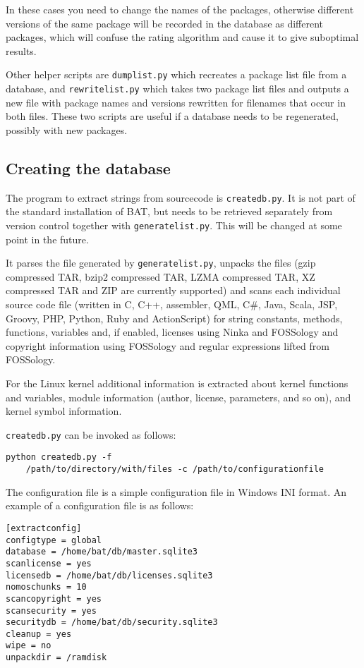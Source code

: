 \documentclass[10pt,a4paper]{article}
\begin{document}
In these cases you need to change the names of the packages, otherwise
different versions of the same package will be recorded in the database as
different packages, which will confuse the rating algorithm and cause it to
give suboptimal results.

Other helper scripts are \texttt{dumplist.py} which recreates a package list
file from a database, and \texttt{rewritelist.py} which takes two package list
files and outputs a new file with package names and versions rewritten for
filenames that occur in both files. These two scripts are useful if a database
needs to be regenerated, possibly with new packages.

\subsection{Creating the database}

The program to extract strings from sourcecode is \texttt{createdb.py}. It is
not part of the standard installation of BAT, but needs to be retrieved
separately from version control together with \texttt{generatelist.py}. This
will be changed at some point in the future.

It parses the file generated by \texttt{generatelist.py}, unpacks the files
(gzip compressed TAR, bzip2 compressed TAR, LZMA compressed TAR, XZ compressed
TAR and ZIP are currently supported) and scans each individual source code file
(written in C, C++, assembler, QML, C\#, Java, Scala, JSP, Groovy, PHP, Python,
Ruby and ActionScript) for string constants, methods, functions, variables and,
if enabled, licenses using Ninka and FOSSology and copyright information using
FOSSology and regular expressions lifted from FOSSology.

For the Linux kernel additional information is extracted about kernel functions
and variables, module information (author, license, parameters, and so on),
and kernel symbol information.

\texttt{createdb.py} can be invoked as follows:

\begin{verbatim}
python createdb.py -f
    /path/to/directory/with/files -c /path/to/configurationfile
\end{verbatim}

The configuration file is a simple configuration file in Windows INI format. An
example of a configuration file is as follows:

\begin{verbatim}
[extractconfig]
configtype = global
database = /home/bat/db/master.sqlite3
scanlicense = yes
licensedb = /home/bat/db/licenses.sqlite3
nomoschunks = 10
scancopyright = yes
scansecurity = yes
securitydb = /home/bat/db/security.sqlite3
cleanup = yes
wipe = no
unpackdir = /ramdisk
\end{verbatim}
\end{document}
